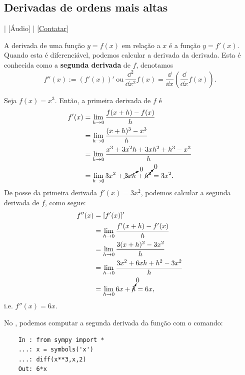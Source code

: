 \subsection{Derivadas de ordens mais altas}

\begin{flushright}
  [Vídeo] | [Áudio] | \href{https://phkonzen.github.io/notas/contato.html}{[Contatar]}
\end{flushright}

A derivada de uma função $y = f(x)$ em relação a $x$ é a função $y = f'(x)$. Quando esta é diferenciável, podemos calcular a derivada da derivada. Esta é conhecida como a {\bf segunda derivada} de $f$, denotamos
\begin{equation}
  f''(x) := (f'(x))' ~ \text{ou} ~ \frac{\dd^2}{\dd x^2}f(x) = \frac{\dd}{\dd x}\left(\frac{\dd}{\dd x}f(x)\right).
\end{equation}

\begin{ex}\label{ex:deriv_fll}
  Seja $f(x) = x^3$. Então, a primeira derivada de $f$ é
  \begin{align}
    f'(x) &= \lim_{h\to 0} \frac{f(x+h)-f(x)}{h} \\
          &= \lim_{h\to 0} \frac{(x+h)^3-x^3}{h}\\
          &= \lim_{h\to 0} \frac{x^3+3x^2h+3xh^2+h^3-x^3}{h}\\
          &= \lim_{h\to 0} 3x^2+\cancelto{0}{3xh}+\cancelto{0}{h^2} = 3x^2.
  \end{align}
  De posse da primeira derivada $f'(x) = 3x^2$, podemos calcular a segunda derivada de $f$, como segue:
  \begin{align}
    f''(x) &= [f'(x)]' \\
           &= \lim_{h\to 0} \frac{f'(x+h)-f'(x)}{h} \\
           &= \lim_{h\to 0} \frac{3(x+h)^2-3x^2}{h} \\
           &= \lim_{h\to 0} \frac{3x^2+6xh+h^2-3x^2}{h} \\
           &= \lim_{h\to 0} 6x+\cancelto{0}{h} = 6x,
  \end{align}
  i.e. $f''(x) = 6x$.

  \ifispython
  No \sympy, podemos computar a segunda derivada da função com o comando:
  \begin{lstlisting}
    In : from sympy import *
    ...: x = symbols('x')
    ...: diff(x**3,x,2)
    Out: 6*x
  \end{lstlisting}
  \fi  
\end{ex}

